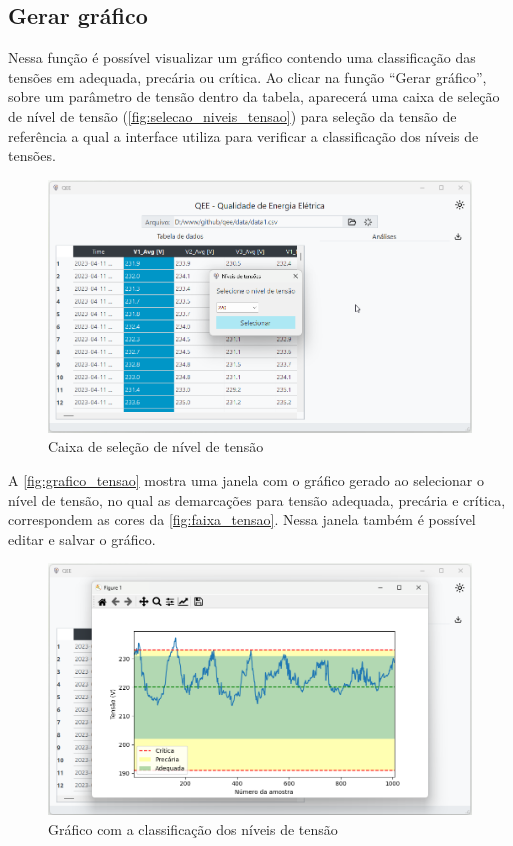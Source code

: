 \subsection{Gerar gráfico}

Nessa função é possível visualizar um gráfico contendo uma classificação das tensões em adequada, precária ou crítica. Ao clicar na função “Gerar gráfico”, sobre um parâmetro de tensão dentro da tabela, aparecerá uma caixa de seleção de nível de tensão (\autoref{fig:selecao_niveis_tensao}) para seleção da tensão de referência a qual a interface utiliza para verificar a classificação dos níveis de tensões.

\begin{figure}[H]
  \centering
  \caption{Caixa de seleção de nível de tensão}
  \label{fig:selecao_niveis_tensao}
  \includegraphics[width=15cm]{illustrations/figures/selecao_niveis_tensao.png}
\end{figure}

A \autoref{fig:grafico_tensao} mostra uma janela com o gráfico gerado ao selecionar o nível de tensão, no qual as demarcações para tensão adequada, precária e crítica, correspondem as cores da \autoref{fig:faixa_tensao}. Nessa janela também é possível editar e salvar o gráfico.

\begin{figure}[H]
  \centering
  \caption{Gráfico com a classificação dos níveis de tensão}
  \label{fig:grafico_tensao}
  \includegraphics[width=15cm]{illustrations/figures/grafico_tensao.png}
\end{figure}

